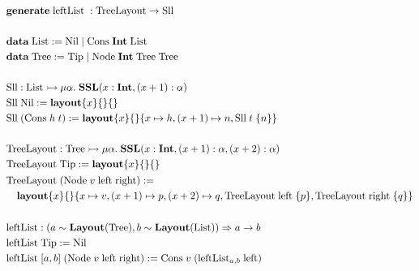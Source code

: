 $\begin{aligned}
  &\generate\; \textrm{leftList}\; : \textrm{TreeLayout} \ra \textrm{Sll}\\
  \\%
  &\data\; \textrm{List} := \textrm{Nil} \mid \textrm{Cons}\; \Int\; \textrm{List}\\
  &\data\; \textrm{Tree} := \textrm{Tip} \mid \textrm{Node}\; \Int\; \textrm{Tree}\; \textrm{Tree}\\
  \\%
  &\textrm{Sll} : \textrm{List} \monic \mu\alpha.\;\SSL(x : \Int, (x+1) : \alpha)\\
  &\textrm{Sll}\; \textrm{Nil} := \sslmath{x}{}{}\\
  &\textrm{Sll}\; (\textrm{Cons}\; h\; t) := \sslmath{x}{}{ x \mapsto h, (x+1) \mapsto n, \textrm{Sll}\; t\; \{n\} }\\
  \\%
  &\textrm{TreeLayout} : \textrm{Tree} \monic \mu\alpha.\;\SSL(x : \Int, (x+1) : \alpha, (x+2) : \alpha)\\
  &\textrm{TreeLayout}\; \textrm{Tip} := \sslmath{x}{}{}\\
  &\begin{aligned}
    \textrm{Tr}&\textrm{eeLayout}\; (\textrm{Node}\; v\; \textrm{left}\; \textrm{right}) :=\\
        &\sslmath{x}{}{ x \mapsto v, (x+1) \mapsto p, (x+2) \mapsto q, \textrm{TreeLayout}\; \textrm{left}\; \{p\}, \textrm{TreeLayout}\; \textrm{right}\; \{q\}}
   \end{aligned}\\
  \\%
  &\textrm{leftList} : (a \isA \Layout{\textrm{Tree}}, b \isA \Layout{\textrm{List}}) \Ra a \ra b\\
  &\textrm{leftList}\; \textrm{Tip} := \textrm{Nil}\\
  &\textrm{leftList}\; [a, b]\; (\textrm{Node}\; v\; \textrm{left}\; \textrm{right}) :=
      \textrm{Cons}\; v\; (\textrm{leftList}_{a,b}\; \textrm{left})
\end{aligned}$
\\

%
%
%
%

